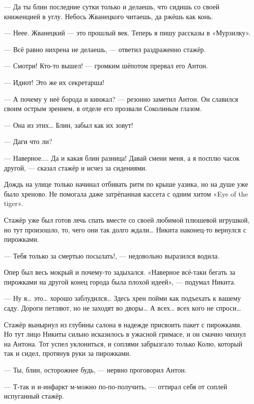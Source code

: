 --- Да ты блин последние сутки только и делаешь, что сидишь со своей книженцией в углу. Небось Жванецкого читаешь, да ржёшь как конь.

--- Неее. Жванецкий --- это прошлый век. Теперь я пишу рассказы в «Мурзилку».

--- Всё равно нихрена не делаешь, --- ответил раздраженно стажёр.

--- Смотри! Кто-то вышел! --- громким шёпотом прервал его Антон.

--- Идиот! Это же их секретарша!

--- А почему у неё борода и кинжал? --- резонно заметил Антон. Он славился своим острым зрением, в отделе его прозвали Соколиным глазом.

--- Она из этих… Блин, забыл как их зовут!

--- Даги что ли?

--- Наверное.... Да и какая блин разница! Давай смени меня, а я посплю часок другой, --- сказал стажёр и исчез за сидениями.


Дождь на улице только начинал отбивать ритм по крыше уазика, но на душе уже было хреново. Не помогала даже затрёпанная кассета с одним хитом «Eye of the tiger».


Стажёр уже был готов лечь спать вместе со своей любимой плюшевой игрушкой, но тут произошло, то, чего они так долго ждали… Никита наконец-то вернулся с пирожками.



--- Тебя только за смертью посылать!, --- недовольно выразился водила.


Опер был весь мокрый и почему-то задыхался. «Наверное всё-таки бегать за пирожками на другой конец города была плохой идеей», --- подумал Никита.



--- Ну я… это… хорошо заблудился… Здесь хрен пойми как подъехать к вашему саду. Дороги петляют, но не заходят во дворы… А всех… всех кого не спроси…


Стажёр вынырнул из глубины салона в надежде присвоить пакет с пирожками. Но тут лицо Никиты сильно исказилось в ужасной гримасе, и он смачно чихнул на Антона. Тот успел уклониться, и соплями забрызгало только Колю, который так и сидел, протянув руки за пирожками.



--- Ты, блин, осторожнее будь, --- нервно проговорил Антон. 

--- Т-так и и-инфаркт м-можно по-по-получить, --- оттирал себя от соплей испуганный стажёр. 

